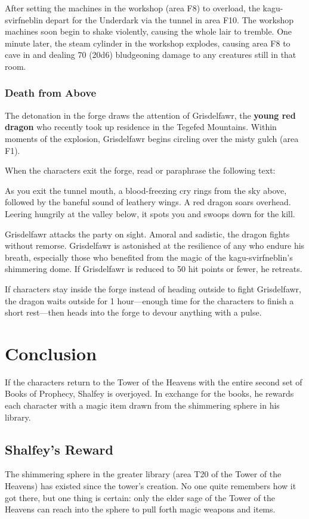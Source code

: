 \documentclass[10pt,a4paper,twoside,bg=print,twocolumn,openany,nodeprecatedcode]{dndbook}
\begin{document}
After setting the machines in the workshop (area F8) to overload, the kagu-svirfneblin depart for the Underdark via the tunnel in area F10. The workshop machines soon begin to shake violently, causing the whole lair to tremble. One minute later, the steam cylinder in the workshop explodes, causing area F8 to cave in and dealing 70 (20d6) bludgeoning damage to any creatures still in that room.

\subsubsection{Death from Above}
The detonation in the forge draws the attention of Grisdelfawr, the \textbf{young red dragon} who recently took up residence in the Tegefed Mountains. Within moments of the explosion, Grisdelfawr begins circling over the misty gulch (area F1).

When the characters exit the forge, read or paraphrase the following text:

\begin{DndReadAloud}{}
As you exit the tunnel mouth, a blood-freezing cry rings from the sky above, followed by the baneful sound of leathery wings. A red dragon soars overhead. Leering hungrily at the valley below, it spots you and swoops down for the kill.

\end{DndReadAloud}

Grisdelfawr attacks the party on sight. Amoral and sadistic, the dragon fights without remorse. Grisdelfawr is astonished at the resilience of any who endure his breath, especially those who benefited from the magic of the kagu-svirfneblin's shimmering dome. If Grisdelfawr is reduced to 50 hit points or fewer, he retreats.

If characters stay inside the forge instead of heading outside to fight Grisdelfawr, the dragon waits outside for 1 hour—enough time for the characters to finish a short rest—then heads into the forge to devour anything with a pulse.

\section{Conclusion}
If the characters return to the Tower of the Heavens with the entire second set of Books of Prophecy, Shalfey is overjoyed. In exchange for the books, he rewards each character with a magic item drawn from the shimmering sphere in his library.

\subsection{Shalfey's Reward}
The shimmering sphere in the greater library (area T20 of the Tower of the Heavens) has existed since the tower's creation. No one quite remembers how it got there, but one thing is certain: only the elder sage of the Tower of the Heavens can reach into the sphere to pull forth magic weapons and items.
\end{document}
